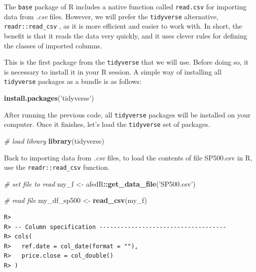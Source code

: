 \documentclass[
  12pt,
]{book}
\newenvironment{Shaded}{\begin{snugshade}}{\end{snugshade}}
\newcommand{\CommentTok}[1]{\textcolor[rgb]{0.37,0.37,0.37}{\textit{#1}}}
\newcommand{\KeywordTok}[1]{\textcolor[rgb]{0.27,0.27,0.27}{\textbf{#1}}}
\newcommand{\NormalTok}[1]{#1}
\newcommand{\OperatorTok}[1]{\textcolor[rgb]{0.43,0.43,0.43}{\textbf{#1}}}
\newcommand{\StringTok}[1]{\textcolor[rgb]{0.5,0.5,0.5}{#1}}
\begin{document}
The \texttt{base} package of R includes a native function called \texttt{read.csv} for importing data from \emph{.csv} files. However, we will prefer the \texttt{tidyverse} alternative, \texttt{readr::read\_csv} \citep{R-readr}, as it is more efficient and easier to work with. In short, the benefit is that it reads the data very quickly, and it uses clever rules for defining the classes of imported columns.

This is the first package from the \texttt{tidyverse} that we will use. Before doing so, it is necessary to install it in your R session. A simple way of installing all \texttt{tidyverse} packages as a bundle is as follows:

\begin{Shaded}
\begin{Highlighting}[]
\KeywordTok{install.packages}\NormalTok{(}\StringTok{'tidyverse'}\NormalTok{)}
\end{Highlighting}
\end{Shaded}

After running the previous code, all \texttt{tidyverse} packages will be installed on your computer. Once it finishes, let's load the \texttt{tidyverse} set of packages.

\begin{Shaded}
\begin{Highlighting}[]
\CommentTok{# load library}
\KeywordTok{library}\NormalTok{(tidyverse)}
\end{Highlighting}
\end{Shaded}

Back to importing data from \emph{.csv} files, to load the contents of file SP500.csv in R, use the \texttt{readr::read\_csv} function. 

\begin{Shaded}
\begin{Highlighting}[]
\CommentTok{# set file to read}
\NormalTok{my_f <-}\StringTok{ }\NormalTok{afedR}\OperatorTok{::}\KeywordTok{get_data_file}\NormalTok{(}\StringTok{'SP500.csv'}\NormalTok{)}

\CommentTok{# read file}
\NormalTok{my_df_sp500 <-}\StringTok{ }\KeywordTok{read_csv}\NormalTok{(my_f)}
\end{Highlighting}
\end{Shaded}

\begin{verbatim}
R> 
R> -- Column specification ------------------------------------
R> cols(
R>   ref.date = col_date(format = ""),
R>   price.close = col_double()
R> )
\end{verbatim}
\end{document}
